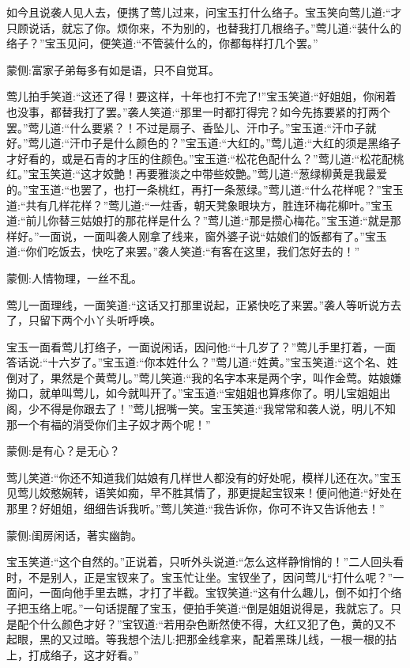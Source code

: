 \begin{parag}
    如今且说袭人见人去，便携了莺儿过来，问宝玉打什么络子。宝玉笑向莺儿道:“才只顾说话，就忘了你。烦你来，不为别的，也替我打几根络子。”莺儿道:“装什么的络子？”宝玉见问，便笑道:“不管装什么的，你都每样打几个罢。”\begin{note}蒙侧:富家子弟每多有如是语，只不自觉耳。\end{note}莺儿拍手笑道:“这还了得！要这样，十年也打不完了!”宝玉笑道:“好姐姐，你闲着也没事，都替我打了罢。”袭人笑道:“那里一时都打得完？如今先拣要紧的打两个罢。”莺儿道:“什么要紧？！不过是扇子、香坠儿、汗巾子。”宝玉道:“汗巾子就好。”莺儿道:“汗巾子是什么颜色的？”宝玉道:“大红的。”莺儿道:“大红的须是黑络子才好看的，或是石青的才压的住颜色。”宝玉道:“松花色配什么？”莺儿道:“松花配桃红。”宝玉笑道:“这才姣艶！再要雅淡之中带些姣艶。”莺儿道:“葱绿柳黄是我最爱的。”宝玉道:“也罢了，也打一条桃红，再打一条葱绿。”莺儿道:“什么花样呢？”宝玉道:“共有几样花样？”莺儿道:“一炷香，朝天凳象眼块方，胜连环梅花柳叶。”宝玉道:“前儿你替三姑娘打的那花样是什么？”莺儿道:“那是攒心梅花。”宝玉道:“就是那样好。”一面说，一面叫袭人刚拿了线来，窗外婆子说“姑娘们的饭都有了。”宝玉道:“你们吃饭去，快吃了来罢。”袭人笑道:“有客在这里，我们怎好去的！”\begin{note}蒙侧:人情物理，一丝不乱。\end{note}莺儿一面理线，一面笑道:“这话又打那里说起，正紧快吃了来罢。”袭人等听说方去了，只留下两个小丫头听呼唤。
\end{parag}


\begin{parag}
    宝玉一面看莺儿打络子，一面说闲话，因问他:“十几岁了？”莺儿手里打着，一面答话说:“十六岁了。”宝玉道:“你本姓什么？”莺儿道:“姓黄。”宝玉笑道:“这个名、姓倒对了，果然是个黄莺儿。”莺儿笑道:“我的名字本来是两个字，叫作金莺。姑娘嫌拗口，就单叫莺儿，如今就叫开了。”宝玉道:“宝姐姐也算疼你了。明儿宝姐姐出阁，少不得是你跟去了！”莺儿抿嘴一笑。宝玉笑道:“我常常和袭人说，明儿不知那一个有福的消受你们主子奴才两个呢！”\begin{note}蒙侧:是有心？是无心？\end{note}莺儿笑道:“你还不知道我们姑娘有几样世人都没有的好处呢，模样儿还在次。”宝玉见莺儿姣憨婉转，语笑如痴，早不胜其情了，那更提起宝钗来！便问他道:“好处在那里？好姐姐，细细告诉我听。”莺儿笑道:“我告诉你，你可不许又告诉他去！”\begin{note}蒙侧:闺房闲话，著实幽韵。\end{note}宝玉笑道:“这个自然的。”正说着，只听外头说道:“怎么这样静悄悄的！”二人回头看时，不是别人，正是宝钗来了。宝玉忙让坐。宝钗坐了，因问莺儿“打什么呢？”一面问，一面向他手里去瞧，才打了半截。宝钗笑道:“这有什么趣儿，倒不如打个络子把玉络上呢。”一句话提醒了宝玉，便拍手笑道:“倒是姐姐说得是，我就忘了。只是配个什么颜色才好？”宝钗道:“若用杂色断然使不得，大红又犯了色，黄的又不起眼，黑的又过暗。等我想个法儿:把那金线拿来，配着黑珠儿线，一根一根的拈上，打成络子，这才好看。”
\end{parag}


